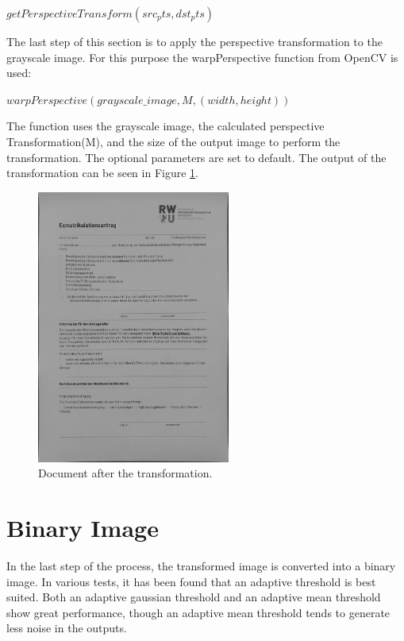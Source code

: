 \documentclass[twocolumn,10pt]{asme2ej}
\begin{document}
\begin{center}
    $getPerspectiveTransform(src_pts, dst_pts)$
\end{center}
The last step of this section is to apply the perspective transformation to the grayscale image. 
For this purpose the warpPerspective function\cite{opencv_warpPerspective} from OpenCV is used:
\begin{center}
    $warpPerspective(grayscale\_image, M, (width, height))$
\end{center}
The function uses the grayscale image, the calculated perspective Transformation(M), and the size of the 
output image to perform the transformation. The optional parameters are set to default.
The output of the transformation can be seen in Figure \ref{fig:transformation}.

\begin{figure}[H]
    \centerline{\includegraphics[width=2.5in]{output/hoch_3_6_transformation.jpg}}
    \caption{Document after the transformation.}
    \label{fig:transformation}
\end{figure}




\section{Binary Image}
\noindent
In the last step of the process, the transformed image is converted into a binary image.
In various tests, it has been found that an adaptive threshold\cite{opencv_adaptivethreshold} is best suited.
Both an adaptive gaussian threshold\cite{opencv_adaptivetypes} and an adaptive mean threshold show great performance, 
though an adaptive mean threshold tends to generate less noise in the outputs.
\end{document}
